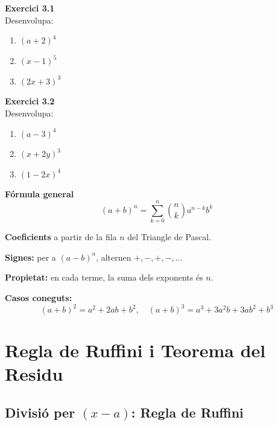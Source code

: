 \documentclass[12pt]{article}
\begin{document}
\begin{exercici}
\textbf{Exercici 3.1}\\
Desenvolupa:
\begin{enumerate}[label=\alph*)]
    \item $(a+2)^4$
    \item $(x-1)^5$
    \item $(2x+3)^3$
\end{enumerate}
\end{exercici}

\begin{exercici}
\textbf{Exercici 3.2}\\
Desenvolupa:
\begin{enumerate}[label=\alph*)]
    \item $(a-3)^4$
    \item $(x+2y)^3$
    \item $(1-2x)^4$
\end{enumerate}
\end{exercici}

\begin{resum}[title=Resum 3: Binomi de Newton]
\textbf{Fórmula general}
\[
(a+b)^n = \sum_{k=0}^{n} \binom{n}{k} a^{n-k} b^k
\]

\textbf{Coeficients} a partir de la fila $n$ del Triangle de Pascal.

\textbf{Signes:} per a $(a-b)^n$, alternen $+, -, +, -, \dots$

\textbf{Propietat:} en cada terme, la suma dels exponents és $n$.

\textbf{Casos coneguts:}
\[
(a+b)^2 = a^2 + 2ab + b^2, \quad
(a+b)^3 = a^3 + 3a^2b + 3ab^2 + b^3
\]
\end{resum}

\newpage

\section{Regla de Ruffini i Teorema del Residu}

\subsection{Divisió per \texorpdfstring{$(x-a)$}{x-a}: Regla de Ruffini}
\end{document}
